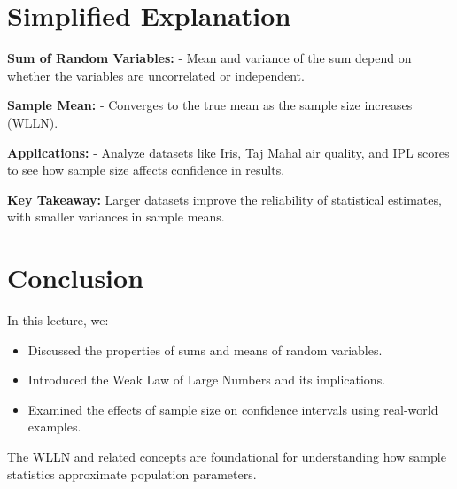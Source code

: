 \documentclass{article}
\begin{document}
\section*{Simplified Explanation}

\textbf{Sum of Random Variables:}
- Mean and variance of the sum depend on whether the variables are uncorrelated or independent.

\textbf{Sample Mean:}
- Converges to the true mean as the sample size increases (WLLN).

\textbf{Applications:}
- Analyze datasets like Iris, Taj Mahal air quality, and IPL scores to see how sample size affects confidence in results.

\textbf{Key Takeaway:}
Larger datasets improve the reliability of statistical estimates, with smaller variances in sample means.

\section*{Conclusion}

In this lecture, we:
\begin{itemize}
  \item Discussed the properties of sums and means of random variables.
  \item Introduced the Weak Law of Large Numbers and its implications.
  \item Examined the effects of sample size on confidence intervals using real-world examples.
\end{itemize}

The WLLN and related concepts are foundational for understanding how sample statistics approximate population parameters.
\end{document}
